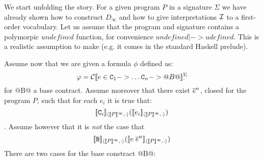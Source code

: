 \documentclass[preprint,nocopyrightspace,draft]{sigplanconf}
\begin{document}
We start unfolding the story. For a given program $P$ in a signature $\Sigma$ we have already 
shown how to construct $D_\infty$ and how to give interpretations ${\cal I}$ to a first-order 
vocabulary. Let us assume that the program and signature contains a polymorpic $undefined$ 
function, for convenience $undefined |-> udefined$. This is a realistic assumption to make 
(e.g. it comes in the standard Haskell prelude).

Assume now that we are given a formula $\phi$ defined as: 
\[  \varphi = {\cal C}[\![e \in {\tt C}_1 -> \ldots {\tt C}_n -> @B@]\!]_{\cdot}^{\Sigma} \] 
for @B@ a base contract. Assume moreover that there exist $\overline{e}^{n}$, closed for the
program $P$, such that for each $e_i$ it is true that:
\[\interp{\Ct_i}{\dbrace{P}^\infty}{\cdot}(\interp{e_i}{\dbrace{P}^\infty}{\cdot})\]. 
Assume however that it is {\em not} the case that
\[\interp{{\tt B}}{\dbrace{P}^\infty}{\cdot}(\interp{e\;\oln{e}{n}}{\dbrace{P}^\infty}{\cdot})\]
There are two cases for the base constract @B@:
\end{document}
